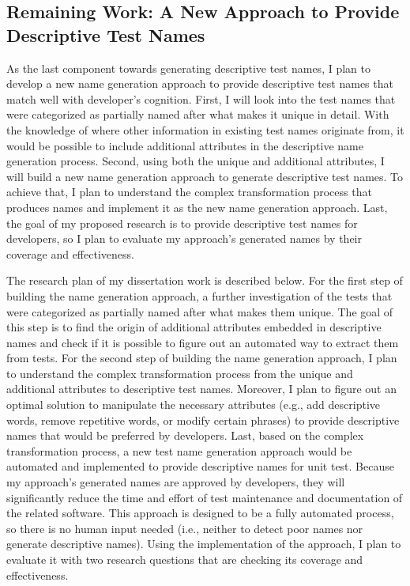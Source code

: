 \subsection{Remaining Work: A New Approach to Provide Descriptive Test Names}
\label{sec:remaining-work}

As the last component towards generating descriptive test names, I plan to develop a new name generation approach to provide descriptive test names that match well with developer's cognition.
%
First, I will look into the test names that were categorized as partially named after what makes it unique in detail.
%
With the knowledge of where other information in existing test names originate from, it would be possible to include additional attributes in the descriptive name generation process.
%
Second, using both the unique and additional attributes, I will build a new name generation approach to generate descriptive test names.
%
To achieve that, I plan to understand the complex transformation process that produces names and implement it as the new name generation approach.
%
Last, the goal of my proposed research is to provide descriptive test names for developers, so I plan to evaluate my approach's generated names by their coverage and effectiveness.


The research plan of my dissertation work is described below.
%
For the first step of building the name generation approach, a further investigation of the tests that were categorized as partially named after what makes them unique.
%
The goal of this step is to find the origin of additional attributes embedded in descriptive names and check if it is possible to figure out an automated way to extract them from tests.
%
For the second step of building the name generation approach, I plan to understand the complex transformation process from the unique and additional attributes to descriptive test names.
%
Moreover, I plan to figure out an optimal solution to manipulate the necessary attributes (e.g., add descriptive words, remove repetitive words, or modify certain phrases) to provide descriptive names that would be preferred by developers.
%
Last, based on the complex transformation process, a new test name generation approach would be automated and implemented to provide descriptive names for unit test.
%
Because my approach's generated names are approved by developers, they will significantly reduce the time and effort of test maintenance and documentation of the related software.
%
This approach is designed to be a fully automated process, so there is no human input needed (i.e., neither to detect poor names nor generate descriptive names).
%
Using the implementation of the approach, I plan to evaluate it with two research questions that are checking its coverage and effectiveness.


